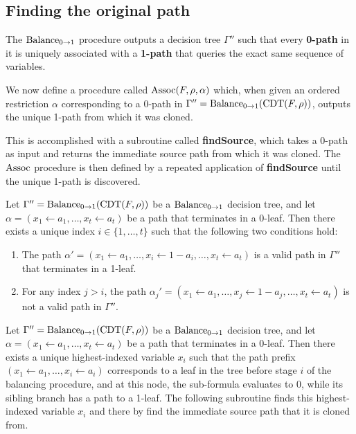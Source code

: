 \subsection{Finding the original path}

The \textbf{$\operatorname{Balance_{0 \to 1}}$} procedure outputs a decision tree $\Gamma''$ such that every \textbf{0-path} in it is uniquely associated with a \textbf{1-path} that queries the exact same sequence of variables.

We now define a procedure called $\operatorname{Assoc}(F,\rho,\alpha)$ which, when given an ordered restriction $\alpha$ corresponding to a 0-path in $\Gamma'' = \operatorname{Balance_{0 \to 1}}(\operatorname{CDT}(F,\rho))$, outputs the unique 1-path from which it was cloned.

This is accomplished with a subroutine called \textbf{findSource}, which takes a 0-path as input and returns the immediate source path from which it was cloned. The $\operatorname{Assoc}$ procedure is then defined by a repeated application of \textbf{findSource} until the unique 1-path is discovered.

\begin{claim}
\label{claim:cloned-path-source}
Let $\Gamma'' = \operatorname{Balance_{0 \to 1}}(\operatorname{CDT}(F, \rho))$ be a $\operatorname{Balance_{0 \to 1}}$ decision tree, and let $\alpha = (x_1 \gets a_1, \dots, x_t \gets a_t)$ be a path that terminates in a 0-leaf. Then there exists a unique index $i \in \{1, \dots, t\}$ such that the following two conditions hold:
\begin{enumerate}
    \item The path $\alpha' = (x_1 \gets a_1, \dots, x_i \gets 1 - a_i, \dots, x_t \gets a_t)$ is a valid path in $\Gamma''$ that terminates in a 1-leaf.
    \item For any index $j > i$, the path $\alpha_j' = (x_1 \gets a_1, \dots, x_j \gets 1 - a_j, \dots, x_t \gets a_t)$ is not a valid path in $\Gamma''$.
\end{enumerate}
\end{claim}

Let $\Gamma'' = \operatorname{Balance_{0 \to 1}}(\operatorname{CDT}(F, \rho))$ be a $\operatorname{Balance_{0 \to 1}}$ decision tree, and let $\alpha = (x_1 \gets a_1, \dots, x_t \gets a_t)$ be a path that terminates in a 0-leaf. Then there exists a unique highest-indexed variable $x_i$ such that the path prefix $(x_1 \gets a_1, \dots, x_i \gets a_i)$ corresponds to a leaf in the tree before stage $i$ of the balancing procedure, and at this node, the sub-formula evaluates to 0, while its sibling branch has a path to a 1-leaf.
The following subroutine finds this highest-indexed variable $x_i$ and there by find the immediate source path that it is cloned from. 

